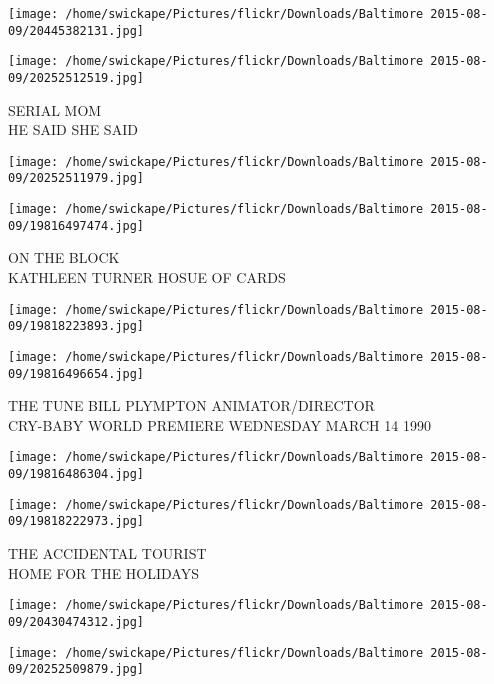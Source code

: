 \documentclass[10pt,letterpaper]{article}
\begin{document}
\texttt{[image: /home/swickape/Pictures/flickr/Downloads/Baltimore 2015-08-09/20445382131.jpg]}

\vspace{0.25in}
\texttt{[image: /home/swickape/Pictures/flickr/Downloads/Baltimore 2015-08-09/20252512519.jpg]}

SERIAL MOM\\
HE SAID SHE SAID\\
\pagebreak

\texttt{[image: /home/swickape/Pictures/flickr/Downloads/Baltimore 2015-08-09/20252511979.jpg]}

\vspace{0.25in}
\texttt{[image: /home/swickape/Pictures/flickr/Downloads/Baltimore 2015-08-09/19816497474.jpg]}

ON THE BLOCK\\
KATHLEEN TURNER HOSUE OF CARDS\\
\pagebreak

\texttt{[image: /home/swickape/Pictures/flickr/Downloads/Baltimore 2015-08-09/19818223893.jpg]}

\vspace{0.25in}
\texttt{[image: /home/swickape/Pictures/flickr/Downloads/Baltimore 2015-08-09/19816496654.jpg]}

THE TUNE BILL PLYMPTON ANIMATOR/DIRECTOR\\
CRY{-}BABY WORLD PREMIERE WEDNESDAY MARCH 14 1990\\
\pagebreak

\texttt{[image: /home/swickape/Pictures/flickr/Downloads/Baltimore 2015-08-09/19816486304.jpg]}

\vspace{0.25in}
\texttt{[image: /home/swickape/Pictures/flickr/Downloads/Baltimore 2015-08-09/19818222973.jpg]}

THE ACCIDENTAL TOURIST\\
HOME FOR THE HOLIDAYS\\
\pagebreak

\texttt{[image: /home/swickape/Pictures/flickr/Downloads/Baltimore 2015-08-09/20430474312.jpg]}

\vspace{0.25in}
\texttt{[image: /home/swickape/Pictures/flickr/Downloads/Baltimore 2015-08-09/20252509879.jpg]}
\end{document}
